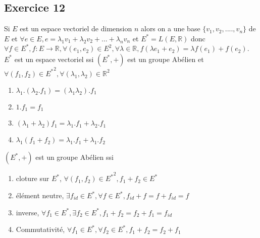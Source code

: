 \documentclass[]{book}
\theoremstyle{definition}
\newcommand{\bb}[1]{\mathbb{#1}}
\newcommand{\R}{\bb{R}}
\begin{document}
\subsection*{Exercice 12}
Si $E$ est un espace vectoriel de dimension $n$ alors on a une base $\{v_1, v_2, ...., v_n\}$ de $E$ et $\forall e \in E, e = \lambda_1 v_1 + \lambda_2 v_2 + \ldots + \lambda_n v_n$ et $E^{*} = L(E, \R)$ donc $\forall f \in E^{*}, f: E \to \R, \forall (e_1,e_2) \in E^2, \forall \lambda \in \R, f(\lambda e_1 + e_2) = \lambda f(e_1) + f(e_2)$. $E^{*}$ est un espace vectoriel ssi $(E^{*},+)$ est un groupe Ab\'elien et $\forall(f_1, f_2) \in {E^{*}}^2, \forall (\lambda_1, \lambda_2) \in \R^2$ 
\begin {enumerate}
\item $\lambda_1.(\lambda_2 . f_1) = (\lambda_1 \lambda_2) . f_1$
\item $1 . f_1 = f_1$
\item $(\lambda_1 + \lambda_2) f_1 = \lambda_1 . f_1 + \lambda_2 . f_1 $
\item $\lambda_1 ( f_1 + f_2) = \lambda_1 . f_1 + \lambda_1 . f_2$
\end{enumerate}

$(E^{*},+)$ est un groupe Ab\'elien ssi
\begin{enumerate}
\item cloture sur $E^{*}$, $\forall (f_1, f_2) \in {E^{*}}^2, f_1 + f_2 \in E^{*}$
\item \'el\'ement neutre, $\exists f_{id} \in E^{*}, \forall f \in E^{*}, f_{id} + f = f + f_{id} = f$
\item inverse, $\forall f_1 \in E^{*}, \exists f_2 \in E^{*}, f_1 + f_2 = f_2 + f_1 = f_{id}$
\item Commutativit\'e, $\forall f_1 \in E^{*}, \forall f_2 \in E^{*}, f_1 + f_2 = f_2 + f_1$
\end{enumerate}
\end{document}
